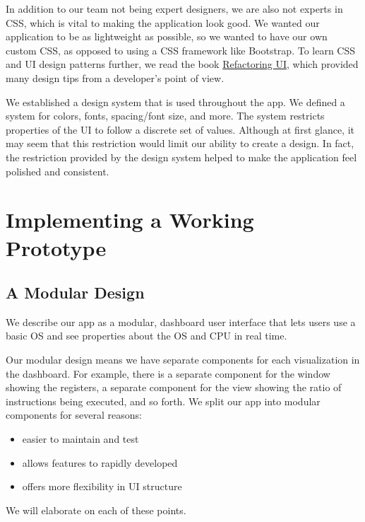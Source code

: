 In addition to our team not being expert designers, we are also not experts in CSS, which
is vital to making the application look good. We wanted our application to be as
lightweight as possible, so we wanted to have our own custom CSS, as opposed to using a CSS
framework like Bootstrap. To learn CSS and UI design
patterns further, we read the book \href{https://refactoringui.com/}{Refactoring UI}, which
provided many design tips from a developer's point of view.

We established a design system that is used throughout the app. We defined a system for colors,
fonts, spacing/font size, and more. The system restricts properties of the UI to follow a discrete
set of values. Although at first glance, it may seem that this restriction would limit our ability
to create a design. In fact, the restriction provided by the design system helped to make
the application feel polished and consistent.


\section{Implementing a Working Prototype}

\subsection*{A Modular Design}

We describe our app as a modular, dashboard user interface that lets users use a
basic OS and see properties about the OS and CPU in real time.

Our modular design means we have separate components for each visualization in the dashboard.
For example, there is a separate component for the window showing the registers, a separate
component for the view showing the ratio of instructions being executed, and so forth.
We split our app into modular components for several reasons:

\begin{itemize}
  \item easier to maintain and test
  \item allows features to rapidly developed
  \item offers more flexibility in UI structure
\end{itemize}

We will elaborate on each of these points.

